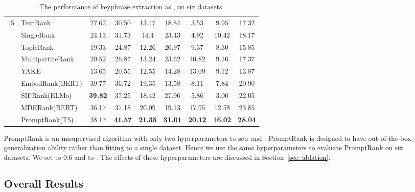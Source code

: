 \documentclass[11pt]{article}
\begin{document}
\begin{table*}[!t]
{\begin{tabular}{clccccccc}
\midrule
\midrule
\multirow{9}{*}{15} & TextRank                & 27.62  & 30.50       & 13.47       & 18.84   & 3.53     & 9.95  & 17.32                 \\
                     & SingleRank              & 24.13  & 31.73       & 14.4        & 23.43   & 4.92    & 10.42  & 18.17                 \\
                     & TopicRank               & 19.33  & 24.87       & 12.26       & 20.97   & 9.37     & 8.30  & 15.85                 \\
                     & MultipartiteRank        & 20.52  & 26.87       & 13.24       & 23.62   & 10.82     & 9.16 & 17.37                 \\
                     & YAKE                    & 13.65  & 20.55       & 12.55       & 14.28   & 13.09     & 9.12 & 13.87                 \\
                     & EmbedRank(BERT)         & 39.77  & 36.72       & 19.35       & 13.58   & 8.11     & 7.84  & 20.90                 \\
                     & SIFRank(ELMo)           & \textbf{39.82}  & 37.25       & 18.42       & 27.96   & 5.86     & 3.00  & 22.05                 \\
                     & MDERank(BERT)           & 36.17  & 37.18       & 20.09       & 19.13   & 17.95    & 12.58 & 23.85                 \\
\cmidrule{2-9}
                     & PromptRank(T5)          & 38.17  & \textbf{41.57}       & \textbf{21.35}       & \textbf{31.01}   & \textbf{20.12}    & \textbf{16.02} & \textbf{28.04}                 \\
\bottomrule
\end{tabular}}
\caption{The performance of keyphrase extraction as ,  on six datasets.} \label{tb: results}
\end{table*}




PromptRank is an unsupervised algorithm with only two hyperparameters to set:   and . PromptRank is designed to have out-of-the-box generalization ability rather than fitting to a single dataset. Hence we use the same hyperparameters to evaluate PromptRank on six datasets. We set  to 0.6 and  to . The effects of these hyperparameters are discussed in Section~\ref{sec: ablation}.


\subsection{Overall Results}
\end{document}
